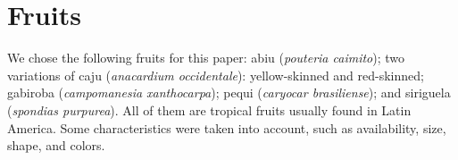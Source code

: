 \documentclass[../main.tex]{subfile}
\begin{document}
\section{Fruits} \label{sec:fruits}
    We chose the following fruits for this paper: abiu (\textit{pouteria caimito}); two variations of caju (\textit{anacardium occidentale}): yellow-skinned and red-skinned; gabiroba (\textit{campomanesia xanthocarpa}); pequi (\textit{caryocar brasiliense}); and siriguela (\textit{spondias purpurea}). All of them are tropical fruits usually found in Latin America. Some characteristics were taken into account, such as availability, size, shape, and colors.
\end{document}
